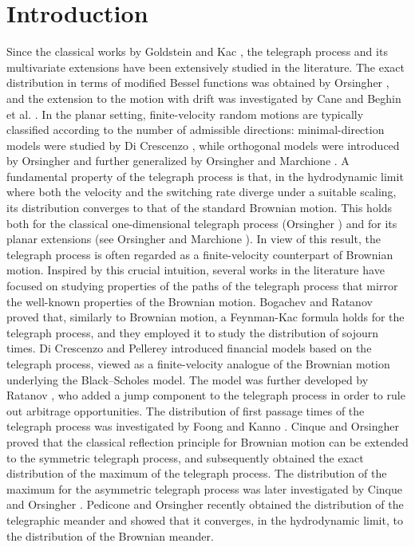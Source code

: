 \documentclass{article}
\begin{document}
\section{Introduction}
Since the classical works by Goldstein \cite{goldstein1951} and Kac \cite{kac1974stochastic}, the telegraph process and its multivariate extensions have been extensively studied in the literature. The exact distribution in terms of modified Bessel functions was obtained by Orsingher \cite{orsingher1990}, and the extension to the motion with drift was investigated by Cane \cite{cane1975} and Beghin et al. \cite{beghinnieddu}. In the planar setting, finite-velocity random motions are typically classified according to the number of admissible directions: minimal-direction models were studied by Di Crescenzo \cite{dicrminimal}, while orthogonal models were introduced by Orsingher \cite{orsingher2000exact} and further generalized by Orsingher and Marchione \cite{vortex}. A fundamental property of the telegraph process is that, in the hydrodynamic limit where both the velocity and the switching rate diverge under a suitable scaling, its distribution converges to that of the standard Brownian motion. This holds both for the classical one-dimensional telegraph process (Orsingher \cite{orsingher1990}) and for its planar extensions (see Orsingher and Marchione \cite{vortex}). In view of this result, the telegraph process is often regarded as a finite-velocity counterpart of Brownian motion. Inspired by this crucial intuition, several works in the literature have focused on studying properties of the paths of the telegraph process that mirror the well-known properties of the Brownian motion. Bogachev and Ratanov \cite{bogachev} proved that, similarly to Brownian motion, a Feynman-Kac formula holds for the telegraph process, and they employed it to study the distribution of sojourn times. Di Crescenzo and Pellerey \cite{dicrpellerey} introduced financial models based on the telegraph process, viewed as a finite-velocity analogue of the Brownian motion underlying the Black–Scholes model. The model was further developed by Ratanov \cite{Ratanov}, who added a jump component to the telegraph process in order to rule out arbitrage opportunities. The distribution of first passage times of the telegraph process was investigated by Foong and Kanno \cite{foong}. Cinque and Orsingher \cite{cinquemax} proved that the classical reflection principle for Brownian motion can be extended to the symmetric telegraph process, and subsequently obtained the exact distribution of the maximum of the telegraph process. The distribution of the maximum for the asymmetric telegraph process was later investigated by  Cinque and Orsingher \cite{cinqueasymm}. Pedicone and Orsingher \cite{pedicone} recently obtained the distribution of the telegraphic meander and showed that it converges, in the hydrodynamic limit, to the distribution of the Brownian meander.\\
\end{document}
